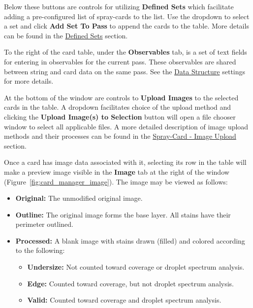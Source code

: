 \documentclass[10pt,letterpaper,titlepage]{article}
\begin{document}
    Below these buttons are controls for utilizing \textbf{Defined Sets} which facilitate adding a pre-configured list of spray-cards to the list. Use the dropdown to select a set and click \textbf{Add Set To Pass} to append the cards to the table. More details can be found in the \hyperref[sec:defined_sets]{Defined Sets} section.\par
    To the right of the card table, under the \textbf{Observables} tab, is a set of text fields for entering in observables for the current pass. These observables are shared between string and card data on the same pass. See the \hyperref[sec:data]{Data Structure} settings for more details.\par
    At the bottom of the window are controls to \textbf{Upload Images} to the selected cards in the table. A dropdown facilitates choice of the upload method and clicking the \textbf{Upload Image(s) to Selection} button will open a file chooser window to select all applicable files. A more detailed description of image upload methods and their processes can be found in the \hyperref[sec:image_upload]{Spray-Card - Image Upload} section.\par
    Once a card has image data associated with it, selecting its row in the table will make a preview image visible in the \textbf{Image} tab at the right of the window (Figure~\ref{fig:card_manager_image}). The image may be viewed as follows:
    \begin{itemize}
        \item \textbf{Original:} The unmodified original image.
        \item \textbf{Outline:} The original image forms the base layer. All stains have their perimeter outlined.
        \item \textbf{Processed:} A blank image with stains drawn (filled) and colored according to the following:
        \begin{itemize}
            \item \textbf{Undersize:} Not counted toward coverage or droplet spectrum analysis.
            \item \textbf{Edge:} Counted toward coverage, but not droplet spectrum analysis.
            \item \textbf{Valid:} Counted toward coverage and droplet spectrum analysis.
        \end{itemize}
    \end{itemize}
\end{document}
